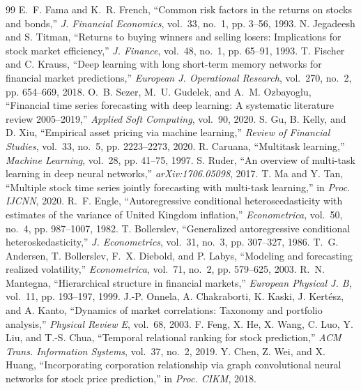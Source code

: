 \documentclass[conference]{IEEEtran}
\begin{document}

\begin{thebibliography}{99}\footnotesize
{} E.~F. Fama and K.~R. French, ``Common risk factors in the returns on stocks and bonds,'' \emph{J. Financial Economics}, vol.~33, no.~1, pp. 3--56, 1993.
 N. Jegadeesh and S. Titman, ``Returns to buying winners and selling losers: Implications for stock market efficiency,'' \emph{J. Finance}, vol.~48, no.~1, pp. 65--91, 1993.
 T. Fischer and C. Krauss, ``Deep learning with long short-term memory networks for financial market predictions,'' \emph{European J. Operational Research}, vol.~270, no.~2, pp. 654--669, 2018.
 O.~B. Sezer, M.~U. Gudelek, and A.~M. Ozbayoglu, ``Financial time series forecasting with deep learning: A systematic literature review 2005--2019,'' \emph{Applied Soft Computing}, vol.~90, 2020.
 S. Gu, B. Kelly, and D. Xiu, ``Empirical asset pricing via machine learning,'' \emph{Review of Financial Studies}, vol.~33, no.~5, pp. 2223--2273, 2020.
 R. Caruana, ``Multitask learning,'' \emph{Machine Learning}, vol.~28, pp. 41--75, 1997.
 S. Ruder, ``An overview of multi-task learning in deep neural networks,'' \emph{arXiv:1706.05098}, 2017.
 T. Ma and Y. Tan, ``Multiple stock time series jointly forecasting with multi-task learning,'' in \emph{Proc. IJCNN}, 2020.
 R.~F. Engle, ``Autoregressive conditional heteroscedasticity with estimates of the variance of United Kingdom inflation,'' \emph{Econometrica}, vol.~50, no.~4, pp. 987--1007, 1982.
 T. Bollerslev, ``Generalized autoregressive conditional heteroskedasticity,'' \emph{J. Econometrics}, vol.~31, no.~3, pp. 307--327, 1986.
 T.~G. Andersen, T. Bollerslev, F.~X. Diebold, and P. Labys, ``Modeling and forecasting realized volatility,'' \emph{Econometrica}, vol.~71, no.~2, pp. 579--625, 2003.
 R.~N. Mantegna, ``Hierarchical structure in financial markets,'' \emph{European Physical J. B}, vol.~11, pp. 193--197, 1999.
 J.-P. Onnela, A. Chakraborti, K. Kaski, J. Kert\'esz, and A. Kanto, ``Dynamics of market correlations: Taxonomy and portfolio analysis,'' \emph{Physical Review E}, vol.~68, 2003.
 F. Feng, X. He, X. Wang, C. Luo, Y. Liu, and T.-S. Chua, ``Temporal relational ranking for stock prediction,'' \emph{ACM Trans. Information Systems}, vol.~37, no.~2, 2019.
 Y. Chen, Z. Wei, and X. Huang, ``Incorporating corporation relationship via graph convolutional neural networks for stock price prediction,'' in \emph{Proc. CIKM}, 2018.

\end{thebibliography}
\end{document}
